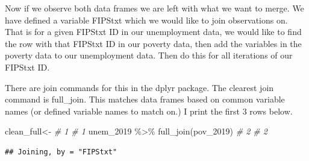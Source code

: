 \documentclass[
]{book}
\newenvironment{Shaded}{\begin{snugshade}}{\end{snugshade}}
\newcommand{\CommentTok}[1]{\textcolor[rgb]{0.56,0.35,0.01}{\textit{#1}}}
\newcommand{\FunctionTok}[1]{\textcolor[rgb]{0.00,0.00,0.00}{#1}}
\newcommand{\NormalTok}[1]{#1}
\newcommand{\OtherTok}[1]{\textcolor[rgb]{0.56,0.35,0.01}{#1}}
\newcommand{\SpecialCharTok}[1]{\textcolor[rgb]{0.00,0.00,0.00}{#1}}
\begin{document}
Now if we observe both data frames we are left with what we want to merge. We have defined a variable FIPStxt which we would like to join observations on. That is for a given FIPStxt ID in our unemployment data, we would like to find the row with that FIPStxt ID in our poverty data, then add the variables in the poverty data to our unemployment data. Then do this for all iterations of our FIPStxt ID.

There are join commands for this in the dplyr package. The clearest join command is full\_join. This matches data frames based on common variable names (or defined variable names to match on.) I print the first 3 rows below.

\begin{Shaded}
\begin{Highlighting}[]
\NormalTok{clean\_full}\OtherTok{\textless{}{-}}                         \CommentTok{\# 1  \# 1}
\NormalTok{  unem\_2019 }\SpecialCharTok{\%\textgreater{}\%} \FunctionTok{full\_join}\NormalTok{(pov\_2019)  }\CommentTok{\# 2  \# 2}
\end{Highlighting}
\end{Shaded}

\begin{verbatim}
## Joining, by = "FIPStxt"
\end{verbatim}
\end{document}
